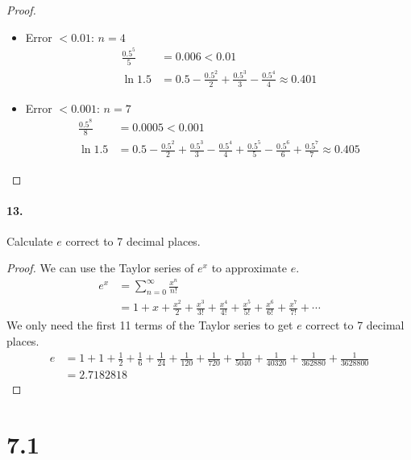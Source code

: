 \documentclass[12pt]{article}
\theoremstyle{remark}
\begin{document}
\begin{proof}
\begin{itemize}
        \item Error $< 0.01$: $n = 4$
        \begin{align*}
            \frac{0.5^{5}}{5} &= 0.006 < 0.01 \\
            \ln 1.5 &= 0.5 - \frac{0.5^2}{2} + \frac{0.5^3}{3} - \frac{0.5^4}{4} \approx 0.401
        \end{align*}
        \item Error $< 0.001$: $n = 7$
        \begin{align*}
            \frac{0.5^{8}}{8} &= 0.0005 < 0.001 \\
            \ln 1.5 &= 0.5 - \frac{0.5^2}{2} + \frac{0.5^3}{3} - \frac{0.5^4}{4} + \frac{0.5^5}{5} - \frac{0.5^6}{6} + \frac{0.5^7}{7} \approx 0.405
        \end{align*}
    \end{itemize}
\end{proof}

\paragraph{13.} Calculate $e$ correct to 7 decimal places.
\begin{proof}
    We can use the Taylor series of $e^x$ to approximate $e$.
    \begin{align*}
        e^x &= \sum_{n = 0}^{\infty} \frac{x^n}{n!} \\
        &= 1 + x + \frac{x^2}{2} + \frac{x^3}{3!} + \frac{x^4}{4!} + \frac{x^5}{5!} + \frac{x^6}{6!} + \frac{x^7}{7!} + \cdots
    \end{align*}
    We only need the first 11 terms of the Taylor series to get $e$ correct to 7 decimal places.
    \begin{align*}
        e &= 1 + 1 + \frac{1}{2} + \frac{1}{6} + \frac{1}{24} + \frac{1}{120} + \frac{1}{720} + \frac{1}{5040} + \frac{1}{40320} + \frac{1}{362880} + \frac{1}{3628800} \\
        &= 2.7182818
    \end{align*}
\end{proof}

\section*{7.1}
\end{document}
